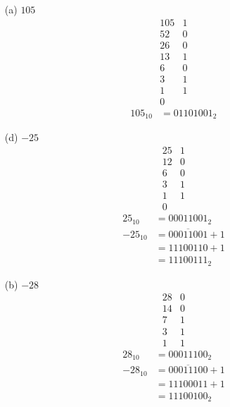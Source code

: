 \begin{changemargin}{-5mm}{-5mm}
\begin{multicols}{3}
\begin{enumerate}

  \item[\textsf{(a)}] \(105\)
  \[
  \begin{array}{r|l}
    105 & 1\\
     52 & 0\\
     26 & 0\\
     13 & 1\\
      6 & 0\\
      3 & 1\\
      1 & 1\\
      0 &
  \end{array}
  \]
  \begin{align*}105_{10}&=01101001_{2}\end{align*}

  \item[\textsf{(d)}] \(-25\)
  \[
  \begin{array}{r|l}
     25 & 1\\
     12 & 0\\
      6 & 0\\
      3 & 1\\
      1 & 1\\
      0 &
  \end{array}
  \]
  \begin{align*}
    25_{10} &= 00011001_{2}\\
   -25_{10} &= \overline{00011001} + 1\\
           &= 11100110 + 1\\
           &= 11100111_{2}
  \end{align*}
\end{enumerate}

\par\vfill\columnbreak

\begin{enumerate}

  \item[\textsf{(b)}] \(-28\)
  \[
  \begin{array}{r|l}
    28 & 0\\
    14 & 0\\
     7 & 1\\
     3 & 1\\
     1 & 1
  \end{array}
  \]
  \begin{align*}
    28_{10}  &= 00011100_2\\
    -28_{10} &= \overline{00011100} + 1\\
            &= 11100011 + 1\\
            &= 11100100_{2}
  \end{align*}


\end{enumerate}
\end{multicols}
\end{changemargin}
